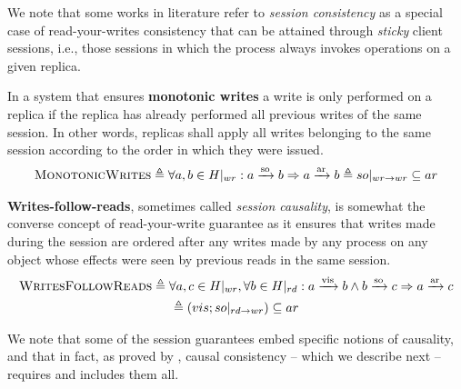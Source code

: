 \documentclass[letter, 11pt]{article}
\newcommand{\citeN}{\citet}
\begin{document}
We note that some works in literature refer to \emph{session consistency} as a special case of
read-your-writes consistency that can be attained through \emph{sticky} client sessions, i.e., those sessions in which the process always invokes operations on a given replica.

In a system that ensures \textbf{monotonic writes} a write is only performed on a replica if the replica has already performed all previous writes of the same session. 
In other words, replicas shall apply all writes belonging to the same session according to the order in which they were issued.
\begin{multline}
\textsc{MonotonicWrites} \triangleq 
\forall a, b \in H|_{wr} : a \xrightarrow[]{\text{so}} b 
\Rightarrow a \xrightarrow[]{\text{ar}} b 
\triangleq so|_{wr \rightarrow wr} \subseteq ar
\label{eq:mw}
\end{multline}


\textbf{Writes-follow-reads}, sometimes called \emph{session causality}, 
is somewhat the converse concept of read-your-write guarantee as it ensures that writes
made during the session are ordered after any writes made 
by any process on any object whose effects were seen by previous reads in the same session.
\begin{multline}
\textsc{WritesFollowReads} \triangleq 
\forall a,c\in H|_{wr}, \forall b\in H|_{rd} : a \xrightarrow[]{\text{vis}} b \wedge b \xrightarrow[]{\text{so}} c \Rightarrow a \xrightarrow[]{\text{ar}} c \\
\triangleq (vis;so|_{rd \rightarrow wr}) \subseteq ar
\end{multline}

We note that some of the session guarantees embed specific notions of causality, 
and that in fact, as proved by \citeN{Brzezinski.ea:04},
causal consistency -- which we describe next -- requires and includes them all.
\end{document}
